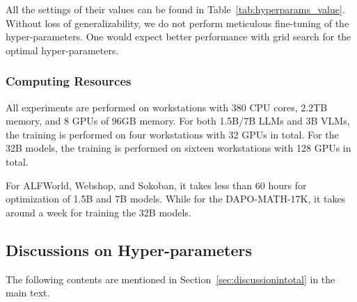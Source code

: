 \documentclass[]{youtu} %
\begin{document}
All the settings of their values can be found in Table~\ref{tab:hyperparams_value}.
Without loss of generalizability,
we do not perform meticulous fine-tuning of the hyper-parameters.
One would expect better performance with grid search for the optimal hyper-parameters.



\subsubsection{Computing Resources}
All experiments are performed on workstations with 380 CPU cores, 2.2TB memory, and 8 GPUs of 96GB memory.
For both 1.5B/7B LLMs and 3B VLMs,
the training is performed on four workstations with 32 GPUs in total.
For the 32B models,
the training is performed on sixteen workstations with 128 GPUs in total.


For ALFWorld, Webshop, and Sokoban,
it takes less than 60 hours for optimization of 1.5B and 7B models.
While for the DAPO-MATH-17K,
it takes around a week for training the 32B models.



\subsection{Discussions on Hyper-parameters}
\label{sec:discusshyper}

The following contents are mentioned in Section~\ref{sec:discussionintotal} in the main text.
\end{document}
